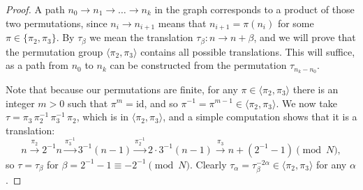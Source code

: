\documentclass[10pt]{article}
\theoremstyle{definition}
\begin{document}
\begin{proof}
    A path $ n_0 \to n_1 \to \ldots \to n_k $ in the graph corresponds to a product of those two permutations,
    since $ n_i \to n_{i+1} $ means that $ n_{i+1} = \pi(n_i) $ for some $ \pi \in \{ \pi_2, \pi_3 \} $.
    By $ \tau_{\beta} $ we mean the translation $ \tau_{\beta} : n \to n + \beta $, and we will prove that
    the permutation group $ \langle \pi_2, \pi_3 \rangle $ contains all possible translations. This will
    suffice, as a path from $ n_0 $ to $ n_k $ can be constructed from the permutation $ \tau_{n_k-n_0} $.

    Note that because our permutations are finite, for any $ \pi \in \langle \pi_2, \pi_3 \rangle $ there
    is an integer $ m > 0 $ such that $ \pi^m = \text{id} $, and so
    $ \pi^{-1} = \pi^{m-1} \in \langle \pi_2, \pi_3 \rangle $. We now take
    $ \tau = \pi_3 \, \pi_2^{-1} \, \pi_3^{-1} \, \pi_2 $, which is in $ \langle \pi_2, \pi_3 \rangle $, and a
    simple computation shows that it is a translation:
    \[ n \stackrel{\pi_2}{\longrightarrow} 2^{-1} n \stackrel{\pi_3^{-1}}{\longrightarrow} 3^{-1} (n - 1)
    \stackrel{\pi_2^{-1}}{\longrightarrow} 2\cdot 3^{-1} (n - 1) \stackrel{\pi_3}{\longrightarrow}
    n + (2^{-1} - 1) \pmod{N} , \]
    so $ \tau = \tau_{\beta} $ for $ \beta = 2^{-1} - 1 \equiv -2^{-1} \pmod{N} $. Clearly
    $ \tau_{\alpha} = \tau_{\beta}^{-2\alpha} \in \langle \pi_2, \pi_3 \rangle $ for any $ \alpha $.
\end{proof}
\end{document}
